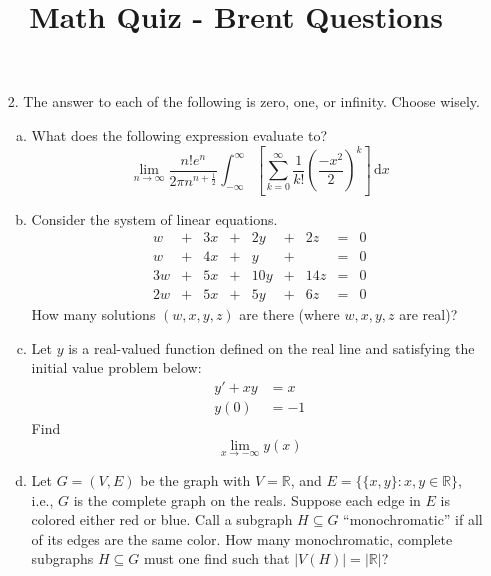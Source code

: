 \documentclass{article}
\title{Math Quiz - Brent Questions}
\begin{document}
\maketitle 

\begin{itemize}
  \item[2.] The answer to each of the following is zero, one, or
    infinity.  Choose wisely.

    \begin{enumerate}[(a)]
      \item What does the following expression evaluate to?
        \[
          \lim_{n \to \infty} \frac{n!e^{n}}{2\pi n^{n + \frac{1}{2}}}
          \int_{-\infty}^{\infty} \left[
            \sum_{k=0}^{\infty} 
            \frac{1}{k!}
            \left(\frac{-x^2}{2}\right)^k
          \right]
          \,\mathrm{d}x
        \]

      \item Consider the system of linear equations.
        \[
          \begin{array}{rcrcrcrcr}
            w   &+& 3x  &+& 2y  &+& 2z  &=& 0 \\
            w   &+& 4x  &+& y   &+&     &=& 0 \\
            3w  &+& 5x  &+& 10y &+& 14z &=& 0 \\
            2w  &+& 5x  &+& 5y  &+& 6z  &=& 0
          \end{array}
        \]
        How many solutions $(w, x, y, z)$ are there (where $w, x, y, z$
        are real)?

      \item Let $y$ is a real-valued function defined on the real line
        and satisfying the initial value problem below:
        \begin{align*}
          y' + xy &= x \\
          y(0) &= -1
        \end{align*}
        Find
        \[
          \lim_{x \to -\infty} y(x)
        \]

      \item Let $G = (V, E)$ be the graph with $V = \mathbb{R}$, and
        $E = \{\{x, y\} : x, y \in \mathbb{R} \}$, i.e., $G$ is the
        complete graph on the reals.  Suppose each edge in $E$ is
        colored either red or blue.  Call a subgraph $H \subseteq G$
        ``monochromatic'' if all of its edges are the same color.  How
        many monochromatic, complete subgraphs $H \subseteq G$ must one
        find such that $|V(H)| = |\mathbb{R}|$?


\end{enumerate}
\end{itemize}
\end{document}

